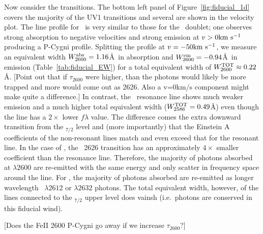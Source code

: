 \documentclass[12pt,preprint]{aastex}
\begin{document}
Now consider the  transitions.
The bottom left panel of Figure~\ref{fig:fiducial_1d} covers the
majority of the  UV1 transitions and several are
shown in the velocity plot.  The line
profile for \feiib\ is very similar to those for the \mgiid\ doublet;
one observes strong absorption to negative velocities and strong
emission at $v > 0 {\rm km~s^{-1}}$ producing a P-Cygni profile.  Splitting
the profile at $v = -50 {\rm km~s^{-1}}$, we measure an equivalent width
$W_{2600}^{\rm abs} = 1.16$\AA\ in absorption and $W_{2600}^{\rm em} =
-0.94$\AA\ in emission (Table~\ref{tab:fiducial_EW}) for a total
equivalent width of $W_{2600}^{\rm TOT} \approx 0.22$\AA.  
[Point out that if $\tau_{2600}$ were higher, than the photons would
likely be more trapped and more would come out as 2626.  Also a
v=0km/s component might make quite a difference.]
In contrast, the \feiia\ resonance line shows much weaker emission and
a much higher total equivalent width ($W_{2586}^{\rm TOT} = 0.49$\AA)
even though the line has a $2 \times$ lower $f\lambda$ value.
The difference comes the extra downward transition from the
\zconfig$_{7/2}$ level and (more importantly) that the Einstein A
coefficients  of the non-resonant lines match and even exceed that for
the resonant line.  In the case of \feiib, the
~2626 transition 
has an approximately  $4\times$ smaller coefficient than the
resonance line.  Therefore, the majority of photons absorbed at
$\lambda 2600$ are re-emitted with the same energy and only scatter 
in frequency space around the line.  For \feiia, 
the majority of photons absorbed are re-emitted 
as longer wavelength ~$\lambda 2612$ or $\lambda 2632$
photons.  
The total equivalent width, however, of the lines connected to the
\zconfig$_{7/2}$ upper level does vainsh (i.e.\ photons are conserved
in this fiducial wind).

[Does the FeII 2600 P-Cygni go away if we increase $\tau_{2600}$?]
\end{document}
